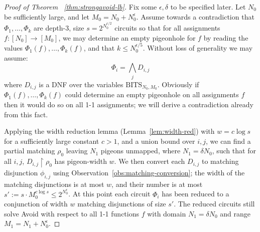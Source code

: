 \documentclass[11pt]{article}
\newcommand{\todo}[1]{\textcolor{red}{TODO: #1}}
\begin{document}
\begin{proof}[Proof of Theorem ~\ref{thm:strongavoid-lb}]
Fix some $\epsilon, \delta$ to be specified later. Let $N_0$ be sufficiently large, and let $M_0 = N_0 + N_0^{\epsilon}$.
Assume towards a contradiction that $\Phi_1,\ldots,\Phi_k$ are depth-3, size $s = 2^{N_0^{\epsilon/2}}$ circuits so that for all assignments $f: [N_0] \to [M_0]$, we may determine an empty pigeonhole for $f$ by reading the values $\Phi_1(f),\ldots,\Phi_k(f)$, and that $k \leq N_0^{\epsilon/5}$. Without loss of generality we may assume:
\[
\Phi_i = \bigwedge_{j} D_{i,j}
\]
where $D_{i,j}$ is a DNF over the variables $\mathrm{BITS}_{N_0,M_0}$. Obviously if $\Phi_1(f),\ldots,\Phi_k(f)$ could determine an empty pigeonhole on all assignments $f$ then it would do so on all 1-1 assignments; we will derive a contradiction already from this fact.


Applying the width reduction lemma (Lemma~\ref{lem:width-red})
with $w = c \log s$ for a sufficiently large constant $c>1$, and a union bound over $i,j$, we can find a partial matching $\rho_0$ 
leaving $N_1$ pigeons unmapped, where $N_1 =  \delta N_0 $, 
such that for all $i,j$, $D_{i,j} \upharpoonright \rho_0$ has pigeon-width $w$. We then convert each $D_{i,j}$ to matching disjunction $\phi_{i,j}$ using Observation~\ref{obs:matching-conversion}; the width of the matching disjunctions is at most $w$, and their number is at most $s':= s \cdot M_0^{c \log s} \leq 2^{N_0^\epsilon}$.
At this point each circuit $\Phi_i$ has been reduced to a conjunction of width $w$ matching disjunctions of size $s'$. The reduced circuits still solve Avoid with respect to all 1-1 functions $f$ with domain  $N_1= \delta N_0 $ and range $M_1 = N_1 + N_0^{\epsilon}$.


\end{proof}
\end{document}

